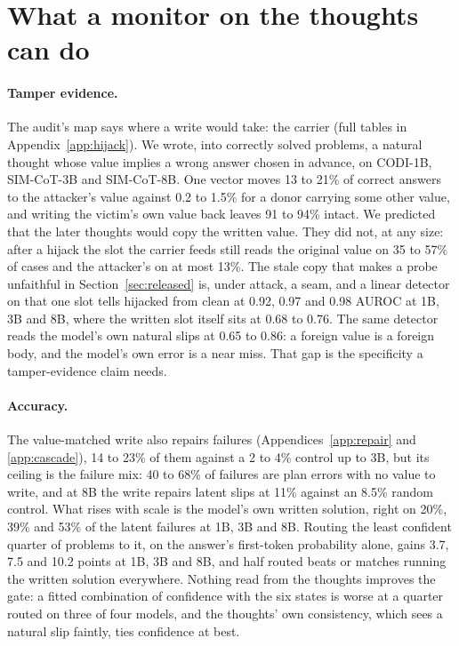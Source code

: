 \documentclass{article}
\begin{document}
\section{What a monitor on the thoughts can do}\label{sec:uses}

\paragraph{Tamper evidence.} The audit's map says where a write would take: the carrier (full tables in Appendix~\ref{app:hijack}). We wrote, into correctly solved problems, a natural thought whose value implies a wrong answer chosen in advance, on CODI-1B, SIM-CoT-3B and SIM-CoT-8B. One vector moves 13 to 21\% of correct answers to the attacker's value against 0.2 to 1.5\% for a donor carrying some other value, and writing the victim's own value back leaves 91 to 94\% intact. We predicted that the later thoughts would copy the written value. They did not, at any size: after a hijack the slot the carrier feeds still reads the original value on 35 to 57\% of cases and the attacker's on at most 13\%. The stale copy that makes a probe unfaithful in Section~\ref{sec:released} is, under attack, a seam, and a linear detector on that one slot tells hijacked from clean at 0.92, 0.97 and 0.98 AUROC at 1B, 3B and 8B, where the written slot itself sits at 0.68 to 0.76. The same detector reads the model's own natural slips at 0.65 to 0.86: a foreign value is a foreign body, and the model's own error is a near miss. That gap is the specificity a tamper-evidence claim needs.

\paragraph{Accuracy.} The value-matched write also repairs failures (Appendices~\ref{app:repair} and \ref{app:cascade}), 14 to 23\% of them against a 2 to 4\% control up to 3B, but its ceiling is the failure mix: 40 to 68\% of failures are plan errors with no value to write, and at 8B the write repairs latent slips at 11\% against an 8.5\% random control. What rises with scale is the model's own written solution, right on 20\%, 39\% and 53\% of the latent failures at 1B, 3B and 8B. Routing the least confident quarter of problems to it, on the answer's first-token probability alone, gains 3.7, 7.5 and 10.2 points at 1B, 3B and 8B, and half routed beats or matches running the written solution everywhere. Nothing read from the thoughts improves the gate: a fitted combination of confidence with the six states is worse at a quarter routed on three of four models, and the thoughts' own consistency, which sees a natural slip faintly, ties confidence at best.
\end{document}
